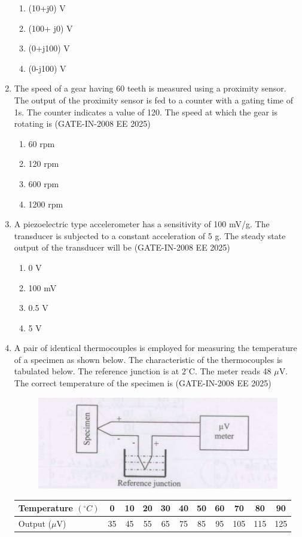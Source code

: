 \documentclass[journal,12pt,onecolumn]{IEEEtran}
\theoremstyle{remark}
\begin{document}
\begin{enumerate}[label=Q.\arabic*,start=1]
    \begin{enumerate} 
        \item (10+j0) V
        \item (100+ j0) V 
        \item (0+j100) V 
        \item (0-j100) V
    \end{enumerate}
    
    \item The speed of a gear having 60 teeth is measured using a proximity sensor. The output of the
proximity sensor is fed to a counter with a gating time of 1s. The counter indicates a value of 120.
The speed at which the gear is rotating is (GATE-IN-2008 EE 2025)

    \begin{enumerate} 
        \item 60 rpm 
        \item 120 rpm
        \item 600 rpm
        \item 1200 rpm 
    \end{enumerate}
    
    \item A piezoelectric type accelerometer has a sensitivity of 100 mV/g. The transducer is subjected to a
constant acceleration of 5 g. The steady state output of the transducer will be (GATE-IN-2008 EE 2025)
    \begin{enumerate} 
        \item 0 V 
        \item 100 mV
        \item 0.5 V
        \item 5 V
    \end{enumerate}
    
    \item A pair of identical thermocouples is employed for measuring the temperature of a specimen as shown below. The characteristic of the thermocouples is tabulated below. The reference junction is at $2^{\circ}$C. The meter reads 48 $\mu$V. The correct temperature of the specimen is (GATE-IN-2008 EE 2025)

\begin{figure}[H]
    \centering
    \includegraphics[width=0.5\linewidth]{figs/i17.jpg}
    \label{fig:placeholder17}
\end{figure}
\begin{tabular}{|l|c|c|c|c|c|c|c|c|c|c|}
\hline
Temperature $(^{\circ}C)$ & 0 & 10 & 20 & 30 & 40 & 50 & 60 & 70 & 80 & 90 \\
\hline
Output ($\mu$V) & 35 & 45 & 55 & 65 & 75 & 85 & 95 & 105 & 115 & 125 \\
\hline
\end{tabular}






\end{enumerate}
\end{document}
